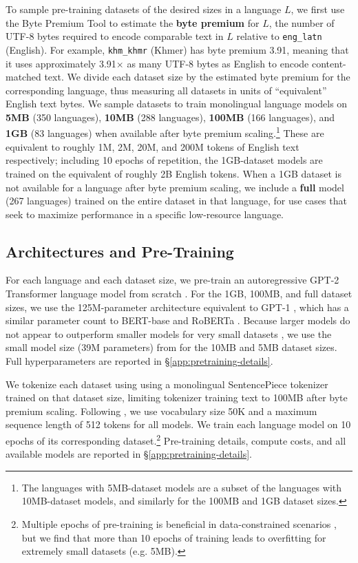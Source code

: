 \documentclass[11pt]{article}
\begin{document}
To sample pre-training datasets of the desired sizes in a language $L$, we first use the Byte Premium Tool \citep{arnett2024bit} to estimate the \textbf{byte premium} for $L$, the number of UTF-8 bytes required to encode comparable text in $L$ relative to \texttt{eng\_latn} (English).
For example, \texttt{khm\_khmr} (Khmer) has byte premium 3.91, meaning that it uses approximately 3.91$\times$ as many UTF-8 bytes as English to encode content-matched text.
We divide each dataset size by the estimated byte premium for the corresponding language, thus measuring all datasets in units of ``equivalent'' English text bytes.
We sample datasets to train monolingual language models on \textbf{5MB} (350 languages), \textbf{10MB} (288 languages), \textbf{100MB} (166 languages), and \textbf{1GB} (83 languages) when available after byte premium scaling.\footnote{The languages with 5MB-dataset models are a subset of the languages with 10MB-dataset models, and similarly for the 100MB and 1GB dataset sizes.}
These are equivalent to roughly 1M, 2M, 20M, and 200M tokens of English text respectively; including 10 epochs of repetition, the 1GB-dataset models are trained on the equivalent of roughly 2B English tokens.
When a 1GB dataset is not available for a language after byte premium scaling, we include a \textbf{full} model (267 languages) trained on the entire dataset in that language, for use cases that seek to maximize performance in a specific low-resource language.

\subsection{Architectures and Pre-Training}
\label{sec:model-training}

For each language and each dataset size, we pre-train an autoregressive GPT-2 Transformer language model from scratch \citep{radford-etal-2019-language}.
For the 1GB, 100MB, and full dataset sizes, we use the 125M-parameter architecture equivalent to GPT-1 \citep{radford-etal-2018-improving}, which has a similar parameter count to BERT-base and RoBERTa \citep{devlin-etal-2019-bert,liu-etal-2019-roberta}.
Because larger models do not appear to outperform smaller models for very small datasets \citep{chang-etal-2023-multilinguality}, we use the small model size (39M parameters) from \citet{turc2019well} for the 10MB and 5MB dataset sizes.
Full hyperparameters are reported in \S\ref{app:pretraining-details}.

We tokenize each dataset using using a monolingual SentencePiece tokenizer \citep{kudo-richardson-2018-sentencepiece} trained on that dataset size, limiting tokenizer training text to 100MB after byte premium scaling.
Following \citet{liu-etal-2019-roberta}, we use vocabulary size 50K and a maximum sequence length of 512 tokens for all models.
We train each language model on 10 epochs of its corresponding dataset.\footnote{Multiple epochs of pre-training is beneficial in data-constrained scenarios \citep{muennighoff-etal-2023-scaling}, but we find that more than 10 epochs of training leads to overfitting for extremely small datasets (e.g. 5MB).}
Pre-training details, compute costs, and all available models are reported in \S\ref{app:pretraining-details}.
\end{document}

